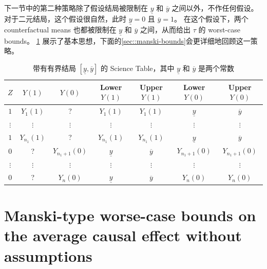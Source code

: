 下一节中的第二种策略除了假设结局被限制在 $\underline{y}$ 和 $\overline{y}$ 之间以外，不作任何假设。
对于二元结局，这个假设很自然，此时 $\underline{y} = 0$ 且 $\overline{y} = 1$。
在这个假设下，两个 counterfactual means 也都被限制在 $\underline{y}$ 和 $\overline{y}$ 之间，从而给出 $\tau$ 的 worst-case bounds。
\cref{table::manski-bounds} 展示了基本思想，下面的\cref{sec::manski-bounds}会更详细地回顾这一策略。


 


 



\begin{table}
\centering
\caption{带有有界结局 $ [\underline{y}, \overline{y}]$ 的 Science Table，其中 $\underline{y}$ 和 $\overline{y}$ 是两个常数}\label{table::manski-bounds}
\begin{tabular}{ccccccc}
\hline 
$Z$ & $Y(1)$ & $Y(0)$ &  Lower $Y(1)$ & Upper $Y(1)$ & Lower $Y(0)$ & Upper $Y(0)$ \\
\hline 
$1$ & $Y_1(1)$ & ? & $Y_1(1)$  & $Y_1(1)$ & $\underline{y}$ & $\overline{y}$ \\
$\vdots$&$\vdots$&$\vdots$&$\vdots$&$\vdots$&$\vdots$&$\vdots$   \\
$1$ & $Y_{n_1}(1)$ & ? &  $Y_{n_1}(1)$  & $Y_{n_1}(1)$ & $\underline{y}$ & $\overline{y}$ \\
\hline 
$0$ & ? & $Y_{n_1+1}(0)$ & $\underline{y}$ & $\overline{y}$& $Y_{n_1+1}(0)$ & $Y_{n_1+1}(0)$ \\ 
$\vdots$&$\vdots$&$\vdots$&$\vdots$&$\vdots$&$\vdots$&$\vdots$ \\ 
$0$ & ? & $Y_{n}(0)$ & $\underline{y}$ & $\overline{y}$& $Y_{n}(0)$ & $Y_{n}(0)$ \\
\hline 
\end{tabular}
\end{table}


\section{Manski-type worse-case bounds on the average causal effect without assumptions}\label{subsection::manski-bounds}
\label{sec::manski-bounds}



